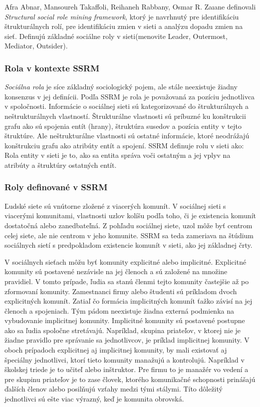 \documentclass[slovak,master,public,dept460,male,cpdeclaration,oneside]{diploma}
\begin{document}
Afra Abnar, Mansoureh Takaffoli, Reihaneh Rabbany, Osmar R. Zaıane \cite{9} definovali \textit{Structural social role mining framework}, ktorý je navrhnutý pre identifikáciu štrukturálnych rolí, pre identifikáciu zmien v sieti a analýzu dopadu zmien na sieť. Definujú základné sociálne roly v sieti(menovite Leader, Outermost, Mediator, Outsider). 

\subsubsection{Rola v kontexte SSRM}
\textit{Sociálna rola} je síce základný sociologický pojem, ale stále neexistuje žiadny konsenzus v jej definícii. Podľa SSRM je rola je považovaná za pozíciu jednotlivca v spoločnosti.
 Informácie o sociálnej sieti sú kategorizované do štrukturálnych a neštrukturálnych vlastností. Štrukturálne vlastnosti sú príbuzné ku konštrukcii grafu ako sú spojenia entít (hrany), štruktúra susedov a pozícia entity v tejto štruktúre. Ale neštrukturálne vlastnosti sú ostatné informácie, ktoré neodrážajú konštrukciu grafu ako atribúty entít a spojení. SSRM definuje rolu v sieti ako: Rola entity v sieti je to, ako sa entita správa voči ostatným a jej vplyv na atribúty a štruktúry ostatných entít.


\subsubsection{Roly definované v SSRM}
Ľudské siete sú vnútorne zložené z viacerých komunít. V sociálnej sieti s viacerými komunitami, vlastnosti uzlov kolíšu podľa toho, či je existencia komunít dostatočná alebo zanedbateľná. Z pohľadu sociálnej siete, uzol môže byť centrom celej siete, ale nie centrom v jeho komunite. SSRM sa teda zameriava na štúdium sociálnych sietí s predpokladom existencie komunít v sieti, ako jej základnej črty.

V sociálnych sieťach môžu byť komunity explicitné alebo implicitné. Explicitné komunity sú postavené nezávisle na jej členoch a sú založené na množine pravidiel. V tomto prípade, ľudia sa stanú členmi tejto komunity častejšie až po zformovaní komunity. Zamestnanci firmy alebo študenti sú príkladom dvoch explicitných komunít. Zatiaľ čo formácia implicitných komunít ťažko závisí na jej členoch a spojeniach. Tým pádom neexistuje žiadna externá podmienka na vybudovanie implicitnej komunity. Implicitné komunity sú postavené postupne ako sa ľudia spoločne stretávajú. Napríklad, skupina priateľov, v ktorej nie je žiadne pravidlo pre správanie sa jednotlivcov, je príklad implicitnej komunity. V oboch prípadoch explicitnej aj implicitnej komunity, by mali existovať aj špeciálny jednotlivci, ktorí tieto komunity manažujú a kontrolujú. Napríklad v školskej triede je to učiteľ alebo inštruktor. Pre firmu to je manažér vo vedení a pre skupinu priateľov je to zase človek, ktorého komunikačné schopnosti prinášajú ďalších členov alebo posilňujú vzťahy medzi tými stálymi. Títo dôležitý jednotlivci sú ešte viac výrazný, keď je komunita obrovská.
\end{document}
